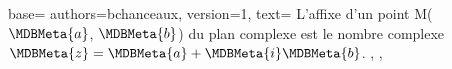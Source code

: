 {
  base={
    authors={bchanceaux},
    version={1},
    text={%
      L'affixe d'un point M($\MDBMeta{a}$, $\MDBMeta{b}$)
      du plan complexe est le nombre complexe
      $\MDBMeta{z} = \MDBMeta{a} + \MDBMeta{i} \MDBMeta{b}$.%
    },
  },
}
